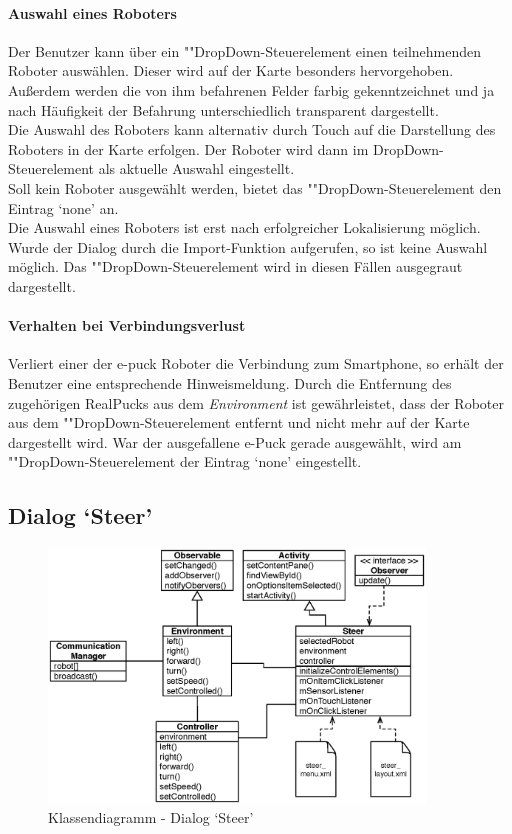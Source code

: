 \documentclass[10pt,a4paper]{article}
\begin{document}
	\paragraph*{Auswahl eines Roboters} Der Benutzer kann über ein ""Drop\-Down-Steu\-er\-ele\-ment einen teilnehmenden Roboter auswählen. Dieser
	wird auf der Karte besonders hervorgehoben. Außerdem werden die von ihm befahrenen Felder farbig gekenntzeichnet und ja nach Häufigkeit der
	Befahrung unterschiedlich transparent dargestellt. \\
	Die Auswahl des Roboters kann alternativ durch Touch auf die Darstellung des Roboters in der Karte erfolgen. Der Roboter wird dann im
	DropDown-Steuerelement als aktuelle Auswahl eingestellt. \\
	Soll kein Roboter ausgewählt werden, bietet das ""Drop\-Down-Steu\-er\-ele\-ment den Eintrag `none' an. \\ 
	Die Auswahl eines Roboters ist erst nach erfolgreicher Lokalisierung möglich. Wurde der Dialog durch die Import-Funktion aufgerufen, so ist keine
	Auswahl möglich. Das ""Drop\-Down-Steu\-er\-ele\-ment wird in diesen Fällen ausgegraut dargestellt.
	
	\paragraph*{Verhalten bei Verbindungsverlust} Verliert einer der e-puck Roboter die Verbindung zum Smartphone, so erhält der Benutzer eine
	entsprechende Hinweismeldung. Durch die Entfernung des zugehörigen RealPucks aus dem \textit{Environment} ist gewährleistet, dass der Roboter aus
	dem ""Drop\-Down-Steu\-er\-ele\-ment entfernt und nicht mehr auf der Karte dargestellt wird. War der ausgefallene e-Puck gerade ausgewählt, wird
	am ""Drop\-Down-Steu\-er\-ele\-ment der Eintrag `none' eingestellt.

	\subsection*{Dialog `Steer'}
	
	\begin{figure}[h]
			\centering
			\includegraphics[width=10cm]{images/entwurf_steer.eps}
  			\caption{Klassendiagramm - Dialog `Steer'}
  			\label{fig:dialog_steer}
  	\end{figure}
	
\end{document}
